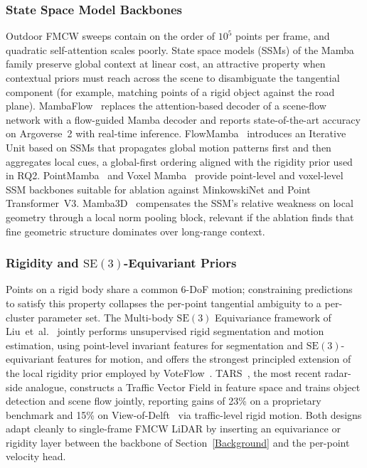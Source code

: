 \subsubsection{State Space Model Backbones}
\label{sec:new_algorithms:mamba}

Outdoor FMCW sweeps contain on the order of $10^5$ points per frame, and quadratic self-attention scales poorly. State space models (SSMs) of the Mamba family preserve global context at linear cost, an attractive property when contextual priors must reach across the scene to disambiguate the tangential component (for example, matching points of a rigid object against the road plane). MambaFlow~\cite{ma2025mambaflow} replaces the attention-based decoder of a scene-flow network with a flow-guided Mamba decoder and reports state-of-the-art accuracy on Argoverse~2 with real-time inference. FlowMamba~\cite{liu2024flowmamba} introduces an Iterative Unit based on SSMs that propagates global motion patterns first and then aggregates local cues, a global-first ordering aligned with the rigidity prior used in RQ2. PointMamba~\cite{liang2024pointmamba} and Voxel Mamba~\cite{nguyen2024voxelmamba} provide point-level and voxel-level SSM backbones suitable for ablation against MinkowskiNet and Point Transformer~V3. Mamba3D~\cite{han2024mamba3d} compensates the SSM's relative weakness on local geometry through a local norm pooling block, relevant if the ablation finds that fine geometric structure dominates over long-range context.

\subsubsection{Rigidity and \texorpdfstring{$\mathrm{SE}(3)$}{SE(3)}-Equivariant Priors}
\label{sec:new_algorithms:rigidity}

Points on a rigid body share a common 6-DoF motion; constraining predictions to satisfy this property collapses the per-point tangential ambiguity to a per-cluster parameter set. The Multi-body $\mathrm{SE}(3)$ Equivariance framework of Liu~et~al.~\cite{liu2024multibodyse3} jointly performs unsupervised rigid segmentation and motion estimation, using point-level invariant features for segmentation and $\mathrm{SE}(3)$-equivariant features for motion, and offers the strongest principled extension of the local rigidity prior employed by VoteFlow~\cite{voteflow2025}. TARS~\cite{wu2025tars}, the most recent radar-side analogue, constructs a Traffic Vector Field in feature space and trains object detection and scene flow jointly, reporting gains of 23\% on a proprietary benchmark and 15\% on View-of-Delft~\cite{palffy2022vod} via traffic-level rigid motion. Both designs adapt cleanly to single-frame FMCW LiDAR by inserting an equivariance or rigidity layer between the backbone of Section~\ref{Background} and the per-point velocity head.

